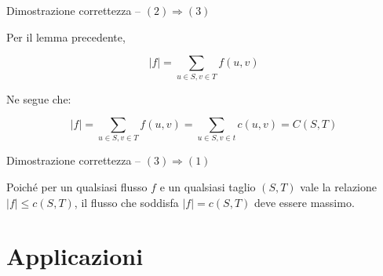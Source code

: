 \begin{frame}{Dimostrazione correttezza -- $(2) \Rightarrow (3)$}

\vspace{-9pt}

\BI
\item Per il lemma precedente,

\[ 
  |f| = \sum_{u \in S, v \in T} f(u,v)
\]
\item Ne segue che:

\[ 
  |f| = \sum_{u \in S, v \in T} f(u,v) = \sum_{u \in S, v \in t} c(u,v) = C(S,T)
\]
\EI

\end{frame}

\begin{frame}{Dimostrazione correttezza -- $(3) \Rightarrow (1)$}

\vspace{-9pt}

\bigskip
Poiché per un qualsiasi flusso $f$ e un qualsiasi taglio $(S,T)$ vale la relazione $|f| \leq c(S,T)$, 
il flusso che soddisfa $|f| = c(S,T)$ deve essere massimo.

\end{frame}

\section{Applicazioni}

